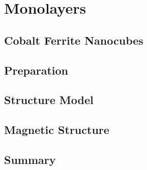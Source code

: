\documentclass[\main/dresen_thesis.tex]{subfiles}
\renewcommand{\thisPath}{\main/chapters/monolayers}
\begin{document}
  \chapter{Monolayers}\label{ch:monolayers}
    

    \section{Cobalt Ferrite Nanocubes}
      

    \FloatBarrier
    \clearpage
    \section{Preparation}
      

    \FloatBarrier
    \clearpage
    \section{Structure Model}
      

    \FloatBarrier
    \section{Magnetic Structure}
      

    \FloatBarrier
    \section{Summary}
      
      
\end{document}
